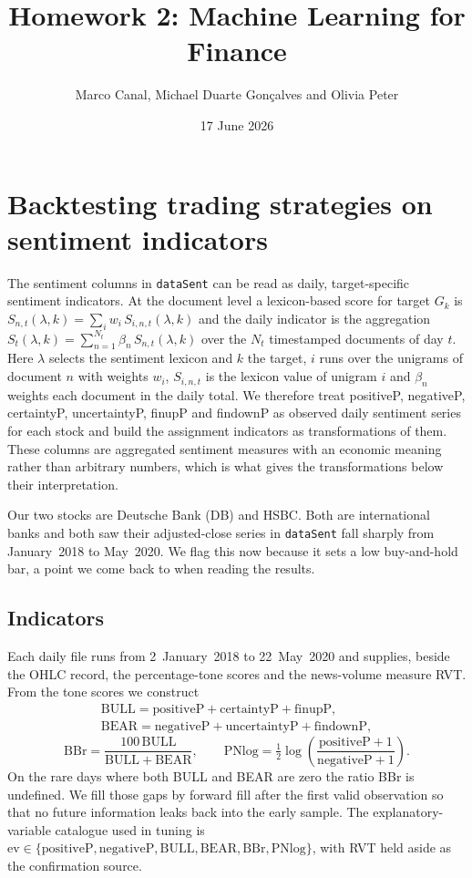 \documentclass[12pt,a4paper]{article}
\title{Homework 2: Machine Learning for Finance}
\author{Marco Canal, Michael Duarte Gonçalves and Olivia Peter}
\date{17 June 2026}
\makeatletter
\newcommand{\ev}{\mathrm{ev}}
\renewcommand{\maketitle}{%
  \begin{center}
  {\Large \@title\par}
  \vspace{0.35em}
  {\fontsize{11pt}{13.2pt}\selectfont \@author\par}
  \vspace{0.15em}
  {\@date\par}
  \end{center}
  \vspace{0.7em}}
\makeatother
\begin{document}
\maketitle
\vspace{0.2em}

\section{Backtesting trading strategies on sentiment indicators}

The sentiment columns in \texttt{dataSent} can be read as daily,
target-specific sentiment indicators. At the document
level a lexicon-based score for target $G_k$ is
$S_{n,t}(\lambda,k)=\sum_i w_i\,S_{i,n,t}(\lambda,k)$ and the daily indicator
is the aggregation $S_t(\lambda,k)=\sum_{n=1}^{N_t}\beta_n\,S_{n,t}(\lambda,k)$
over the $N_t$ timestamped documents of day $t$. Here $\lambda$ selects the
sentiment lexicon and $k$ the target, $i$ runs over the unigrams of document $n$
with weights $w_i$, $S_{i,n,t}$ is the lexicon value of unigram $i$ and
$\beta_n$ weights each document in the daily total. We therefore treat
positiveP, negativeP, certaintyP, uncertaintyP, finupP and findownP as
observed daily sentiment series for each stock and build the assignment
indicators as transformations of them. These columns are aggregated sentiment
measures with an economic meaning rather than arbitrary numbers, which is what
gives the transformations below their interpretation.

Our two stocks are Deutsche Bank (DB) and HSBC. Both are international banks and
both saw their adjusted-close series in \texttt{dataSent} fall sharply from
January~2018 to May~2020. We flag this now because it sets a low buy-and-hold
bar, a point we come back to when reading the results.

\subsection{Indicators}
Each daily file runs from 2~January~2018 to 22~May~2020 and supplies, beside the
OHLC record, the percentage-tone scores and the news-volume measure RVT. From
the tone scores we construct
\begin{gather*}
\mathrm{BULL} = \mathrm{positiveP} + \mathrm{certaintyP} + \mathrm{finupP}, \\
\mathrm{BEAR} = \mathrm{negativeP} + \mathrm{uncertaintyP} + \mathrm{findownP},
\end{gather*}
\[
\mathrm{BBr} = \frac{100\,\mathrm{BULL}}{\mathrm{BULL} + \mathrm{BEAR}},
\qquad
\mathrm{PNlog} = \tfrac{1}{2}\log\!\left(\frac{\mathrm{positiveP} + 1}{\mathrm{negativeP} + 1}\right).
\]
On the rare days where both BULL and BEAR are zero the ratio BBr is undefined.
We fill those gaps by forward fill after the first valid observation so that no
future information leaks back into the early sample. The explanatory-variable
catalogue used in tuning is
$\ev \in \{\mathrm{positiveP}, \mathrm{negativeP}, \mathrm{BULL}, \mathrm{BEAR},
\mathrm{BBr}, \mathrm{PNlog}\}$, with RVT held aside as the confirmation source.
\end{document}
